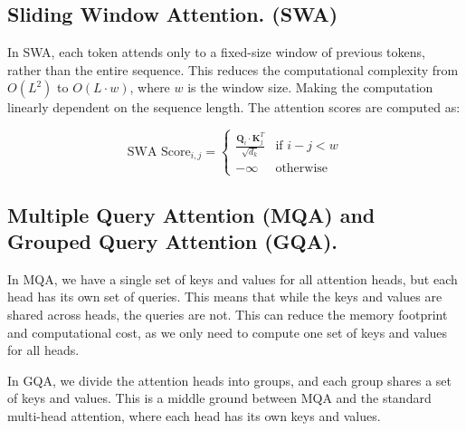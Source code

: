 \documentclass[10pt]{article}
\theoremstyle{plain}
\begin{document}
\subsection{Sliding Window Attention. (SWA)}

In SWA, each token attends only to a fixed-size window of previous tokens, rather than the entire sequence. This reduces the computational complexity from \(O(L^2)\) to \(O(L \cdot w)\), where \(w\) is the window size. Making the computation linearly dependent on the sequence length. The attention scores are computed as:

\[
    \text{SWA Score}_{i,j} = \begin{cases}
        \frac{\mathbf{Q}_i \cdot \mathbf{K}_j^T}{\sqrt{d_k}} & \text{if } i - j < w \\
        -\infty & \text{otherwise}
    \end{cases}
\]

\subsection{Multiple Query Attention (MQA) and Grouped Query Attention (GQA).}

In MQA, we have a single set of keys and values for all attention heads, but each head has its own set of queries. This means that while the keys and values are shared across heads, the queries are not. This can reduce the memory footprint and computational cost, as we only need to compute one set of keys and values for all heads.

In GQA, we divide the attention heads into groups, and each group shares a set of keys and values. This is a middle ground between MQA and the standard multi-head attention, where each head has its own keys and values.
\end{document}
